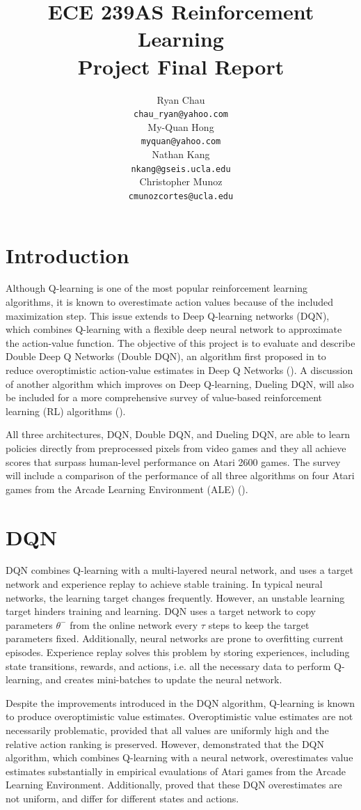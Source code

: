 \documentclass{article}
\title{ECE 239AS Reinforcement Learning\\
       Project Final Report}
\author{%
    Ryan Chau \\
    \texttt{chau\_ryan@yahoo.com}\\
    \And
    My-Quan Hong \\
    \texttt{myquan@yahoo.com} \\
    \And
    Nathan Kang \\
    \texttt{nkang@gseis.ucla.edu} \\
    \And
    Christopher Munoz \\
    \texttt{cmunozcortes@ucla.edu} \\
}
\begin{document}
\maketitle

\section{Introduction}
Although Q-learning is one of the most popular reinforcement learning
algorithms, it is known to overestimate action values because of the included
maximization step. This issue extends to Deep Q-learning networks (DQN), which
combines Q-learning with a flexible deep neural network to approximate the
action-value function. The objective of this project is to evaluate and describe
Double Deep Q Networks (Double DQN), an algorithm first proposed in
\citet{van2016deep} to reduce overoptimistic action-value estimates in Deep Q Networks 
(\cite{mnih2015human}). A discussion of another algorithm which improves on Deep 
Q-learning, Dueling DQN, will also be included for a more comprehensive survey
of value-based reinforcement learning (RL) algorithms (\cite{wang2016dueling}).

All three architectures, DQN, Double DQN, and Dueling DQN, are able to learn policies 
directly from preprocessed pixels from video games and they all achieve scores that 
surpass human-level performance on Atari 2600 games.  The survey will include a 
comparison of the performance of all three algorithms on four Atari games from the 
Arcade Learning Environment (ALE) (\cite{bellemare2013arcade}).

\section{DQN}
DQN combines Q-learning with a multi-layered neural network, and uses a target 
network and experience replay to achieve stable training. In typical neural networks,
the learning target changes frequently. However, an unstable learning target hinders
training and learning. DQN uses a target network to copy parameters $\theta^-$ from
the online network every $\tau$ steps to keep the target parameters fixed. 
Additionally, neural networks are prone to overfitting current episodes. Experience
replay solves this problem by storing experiences, including state transitions, 
rewards, and actions, i.e. all the necessary data to perform Q-learning, and creates 
mini-batches to update the neural network.

Despite the improvements introduced in the DQN algorithm, Q-learning is known to 
produce overoptimistic value estimates. Overoptimistic value estimates are not necessarily 
problematic, provided that all values are uniformly high and the relative action ranking is 
preserved. However, \citet{van2016deep} demonstrated that the DQN algorithm, which combines 
Q-learning with a neural network, overestimates value estimates substantially in empirical 
evaulations of Atari games from the Arcade Learning Environment. Additionally, 
\citet{van2016deep} proved that these DQN overestimates are not uniform, and differ for 
different states and actions.
\end{document}

